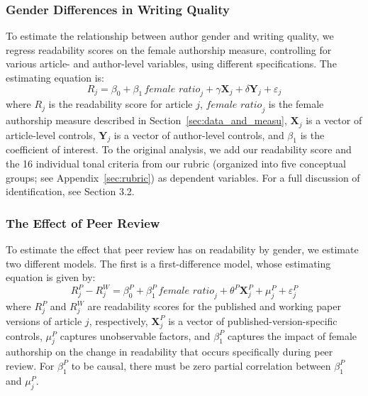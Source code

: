 \subsubsection{Gender Differences in Writing Quality}\label{sec:Gen_Diff_Method}

To estimate the relationship between author gender and writing quality, we regress readability scores on the female authorship measure, controlling for various article- and author-level variables, using different specifications. The estimating equation is:
\begin{equation}
R_j = \beta_0 + \beta_1 \, \textit{female ratio}_j + \gamma \mathbf{X}_j + \delta \mathbf{Y}_j + \varepsilon_j
\label{eq:gender_diff}\end{equation}
where $R_j$ is the readability score for article $j$, $\textit{female ratio}_j$ is the female authorship measure described in Section~\ref{sec:data_and_measu}, $\mathbf{X}_j$ is a vector of article-level controls, $\mathbf{Y}_j$ is a vector of author-level controls, and $\beta_1$ is the coefficient of interest. To the original analysis, we add our readability score and the 16 individual tonal criteria from our rubric (organized into five conceptual groups; see Appendix~\ref{sec:rubric}) as dependent variables. For a full discussion of identification, see \textcite{hengel2022publishing} Section 3.2.

\subsubsection{The Effect of Peer Review}\label{sec:Peer_Review_Method}

To estimate the effect that peer review has on readability by gender, we estimate two different models. The first is a first-difference model, whose estimating equation is given by: 
\begin{equation}
R_j^P - R_j^W = \beta_0^P + \beta_1^P \, \textit{female ratio}_j + \theta^P \mathbf{X}_j^P + \mu_j^P + \varepsilon_j^P
\label{eq:first_diff}\end{equation}
where $R_j^P$ and $R_j^W$ are readability scores for the published and working paper versions of article $j$, respectively, $\mathbf{X}_j^P$ is a vector of published-version-specific controls, $\mu_j^P$ captures unobservable factors, and $\beta_1^P$ captures the impact of female authorship on the change in readability that occurs specifically during peer review. For $\beta_1^P$ to be causal, there must be zero partial correlation between $\beta_1^P$ and $\mu_j^P$. 

